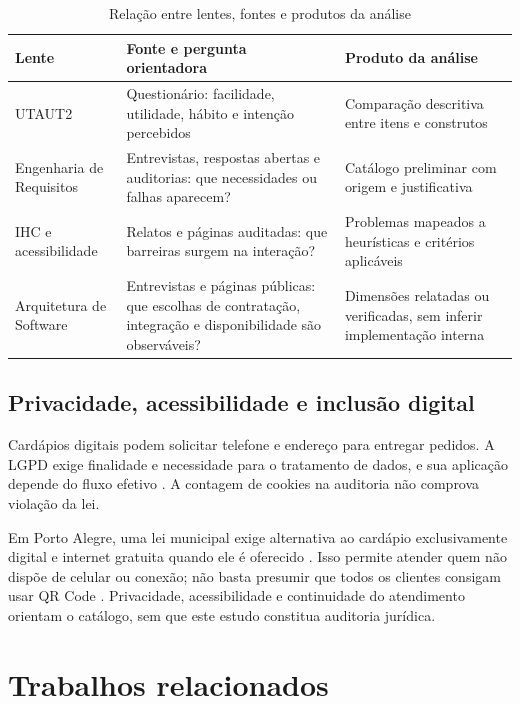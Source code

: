 \begin{table}[!ht]
    \caption{Relação entre lentes, fontes e produtos da análise}
    \label{tab:lentes-analise}
    \centering
    \small
    \begin{tabular}{@{}p{3.1cm}p{5.3cm}p{5.1cm}@{}}
        \toprule
        \textbf{Lente} & \textbf{Fonte e pergunta orientadora} & \textbf{Produto da análise} \\
        \midrule
        UTAUT2 & Questionário: facilidade, utilidade, hábito e intenção percebidos & Comparação descritiva entre itens e construtos \\
        Engenharia de Requisitos & Entrevistas, respostas abertas e auditorias: que necessidades ou falhas aparecem? & Catálogo preliminar com origem e justificativa \\
        IHC e acessibilidade & Relatos e páginas auditadas: que barreiras surgem na interação? & Problemas mapeados a heurísticas e critérios aplicáveis \\
        Arquitetura de Software & Entrevistas e páginas públicas: que escolhas de contratação, integração e disponibilidade são observáveis? & Dimensões relatadas ou verificadas, sem inferir implementação interna \\
        \bottomrule
    \end{tabular}
\end{table}

\section{Privacidade, acessibilidade e inclusão digital}
\label{sec:lgpd}

Cardápios digitais podem solicitar telefone e endereço para entregar pedidos. A LGPD exige finalidade e necessidade para o tratamento de dados, e sua aplicação depende do fluxo efetivo \cite{martins2021principiologia,almeida2022impactos}. A contagem de cookies na auditoria não comprova violação da lei.

Em Porto Alegre, uma lei municipal exige alternativa ao cardápio exclusivamente digital e internet gratuita quando ele é oferecido \cite{camarapoa2024cardapio}. Isso permite atender quem não dispõe de celular ou conexão; não basta presumir que todos os clientes consigam usar QR Code \cite{rocha2025abusividade}. Privacidade, acessibilidade e continuidade do atendimento orientam o catálogo, sem que este estudo constitua auditoria jurídica.

\chapter{Trabalhos relacionados}
\label{sec:trabalhos-relacionados}

